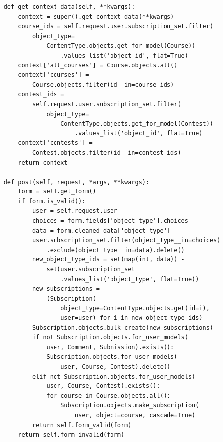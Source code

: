 \documentclass[12pt, a4paper, oneside]{article}
\begin{document}
\begin{enumerate}[wide, labelindent=0pt]
{\begin{verbatim}
    def get_context_data(self, **kwargs):
        context = super().get_context_data(**kwargs)
        course_ids = self.request.user.subscription_set.filter(
            object_type=
                ContentType.objects.get_for_model(Course))
                    .values_list('object_id', flat=True)
        context['all_courses'] = Course.objects.all()
        context['courses'] = 
            Course.objects.filter(id__in=course_ids)
        contest_ids = 
            self.request.user.subscription_set.filter(
                object_type=
                    ContentType.objects.get_for_model(Contest))
                        .values_list('object_id', flat=True)
        context['contests'] = 
            Contest.objects.filter(id__in=contest_ids)
        return context

    def post(self, request, *args, **kwargs):
        form = self.get_form()
        if form.is_valid():
            user = self.request.user
            choices = form.fields['object_type'].choices
            data = form.cleaned_data['object_type']
            user.subscription_set.filter(object_type__in=choices)
                .exclude(object_type__in=data).delete()
            new_object_type_ids = set(map(int, data)) - 
                set(user.subscription_set
                    .values_list('object_type', flat=True))
            new_subscriptions = 
                (Subscription(
                    object_type=ContentType.objects.get(id=i), 
                    user=user) for i in new_object_type_ids)
            Subscription.objects.bulk_create(new_subscriptions)
            if not Subscription.objects.for_user_models(
                user, Comment, Submission).exists():
                Subscription.objects.for_user_models(
                    user, Course, Contest).delete()
            elif not Subscription.objects.for_user_models(
                user, Course, Contest).exists():
                for course in Course.objects.all():
                    Subscription.objects.make_subscription(
                        user, object=course, cascade=True)
            return self.form_valid(form)
        return self.form_invalid(form)
    

\end{verbatim}}
\end{enumerate}
\end{document}
